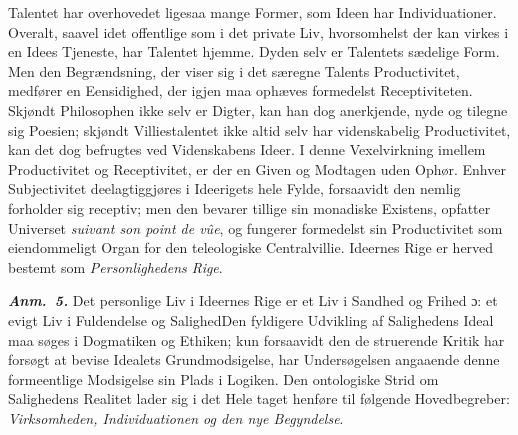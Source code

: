 \documentclass[12pt]{book}
\newcommand{\anm}[1]{\emph{\textbf{Anm.~#1.}}}
\newcommand{\dsi}{\textup{ɔ:}}
\newcommand{\opage}[1]{\marginnote{\footnotesize\textit{[#1]}}}
\begin{document}
Talentet har overhovedet ligesaa mange Former, som Ideen har Individuationer.
Overalt, saavel idet offentlige som i det private Liv, hvorsomhelst der kan virkes i
en Idees Tjeneste, har Talentet hjemme. Dyden selv er Talentets sædelige Form. Men
den Begrændsning, der viser sig i det særegne Talents Productivitet, medfører en
Eensidighed, der igjen maa ophæves formedelst Receptiviteten. Skjøndt Philosophen
ikke selv er Digter, kan han dog anerkjende, nyde og tilegne sig Poesien; skjøndt
Villiestalentet ikke altid selv har videnskabelig Productivitet, kan det dog
befrugtes ved Videnskabens Ideer. I denne Vexelvirkning imellem Productivitet og
Receptivitet, er der en Given og Modtagen uden Ophør. Enhver Subjectivitet
deelagtiggjøres i Ideerigets hele Fylde, forsaavidt den nemlig forholder sig
receptiv; men den bevarer tillige sin monadiske Existens, opfatter Universet
\textit{suivant son point de vûe}, og fungerer formedelst sin Productivitet som
eiendommeligt Organ for den teleologiske Centralvillie. Ideernes Rige er herved
bestemt som \emph{Personlighedens Rige}.

\anm{5} Det personlige Liv i Ideernes Rige er et Liv i Sandhed og Frihed \dsi{} et
evigt Liv i Fuldendelse og Salighed\quad Den fyldigere Udvikling af Salighedens
Ideal maa søges i Dogmatiken og Ethiken; kun forsaavidt den de%
\opage{273}struerende Kritik har forsøgt at bevise Idealets Grundmodsigelse, har Undersøgelsen
angaaende denne formeentlige Modsigelse sin Plads i Logiken. Den ontologiske Strid
om Salighedens Realitet lader sig i det Hele taget henføre til følgende
Hovedbegreber: \emph{Virksomheden, Individuationen og den nye Begyndelse}.
\end{document}
